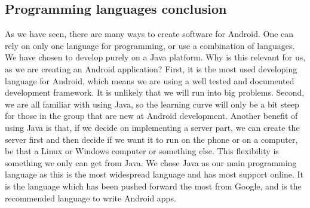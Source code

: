 \subsection{Programming languages conclusion}
As we have seen, there are many ways to create software for Android. One can rely on only one language for programming, or use a combination of languages. We have chosen to develop purely on a Java platform. Why is this relevant for us, as we are creating an Android application?
\newline
\newline
First, it is the most used developing language for Android, which means we are using a well tested and documented development framework. It is unlikely that we will run into big problems. Second, we are all familiar with using Java, so the learning curve will only be a bit steep for those in the group that are new at Android development.  Another benefit of using Java is that, if we decide on implementing a server part, we can create the server first and then decide if we want it to run on the phone or on a computer, be that a Linux or Windows computer or something else. This flexibility is something we only can get from Java.
\newline
\newline
We chose Java as our main programming language as this is the most widespread language and has most support online. It is the language which has been pushed forward the most from Google, and is the recommended language to write Android apps.





